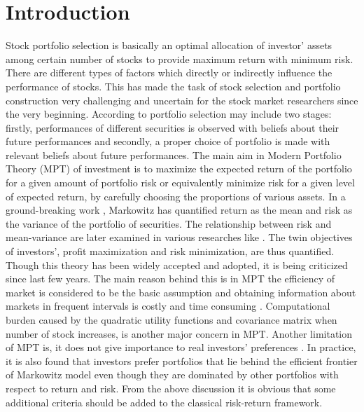 \documentclass{elsarticle}
\begin{document}
\let\Oldsubsection\subsection
\renewcommand{\subsection}{\FloatBarrier\Oldsubsection}
\let\Oldsubsubsection\subsubsection
\renewcommand{\subsubsection}{\FloatBarrier\Oldsubsubsection}
\section{Introduction}
Stock portfolio selection is basically an optimal allocation of investor' assets among certain number of stocks to 
provide maximum return with minimum risk. There are different types of factors which directly or indirectly influence 
the performance of stocks. This has made the task of stock selection and portfolio construction very challenging and 
uncertain for the stock market researchers since the very beginning. According to \cite{Markowitz1952} portfolio 
selection may include two stages: firstly, performances of different securities is observed with beliefs about their 
future performances and secondly, a proper choice of portfolio is made with relevant beliefs about future performances. 
The main aim in Modern Portfolio Theory (MPT) of investment is to maximize the expected return of the portfolio for a 
given amount of portfolio risk or  equivalently  minimize risk for a given level of expected return, by carefully 
choosing the proportions of various assets. In a ground-breaking work \cite{Markowitz1952}, Markowitz has quantified 
return as the mean and risk as the variance of the portfolio of securities. The relationship between risk and 
mean-variance are later examined in various researches like \cite{Zhou2000,Fang2006,Ogryczak2000,Huang2008}. The twin 
objectives of investors', profit maximization and risk minimization, are thus quantified. Though this theory has been 
widely accepted and adopted, it is being criticized since last few years. The main reason behind this is in MPT 
the efficiency of market is considered to be the basic assumption and obtaining information about markets in frequent 
intervals is costly and time consuming \cite{Grossman1980}. Computational burden caused by the quadratic 
utility functions and covariance matrix when number of stock increases, is another major concern in MPT. Another 
limitation of MPT is, it does not give importance to real investors' preferences \cite{Xidonas2009}. In practice, it 
is also found that investors prefer portfolios that lie behind the efficient frontier of Markowitz model even though 
they are dominated by other portfolios with respect to return and risk. From the above discussion it is obvious that 
some additional criteria should be added to the classical risk-return framework.
\end{document}
